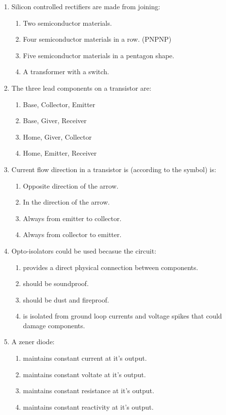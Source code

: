 \documentclass[10pt]{article}
\begin{document}
\begin{multicols}{2}
\begin{enumerate}
\begin{enumerate}
	\end{enumerate}
\item Silicon controlled rectifiers are made from joining:
	\begin{enumerate}
	\item Two semiconductor materials.
	\item Four semiconductor materials in a row. (PNPNP)
	\item Five semiconductor materials in a pentagon shape.
	\item A transformer with a switch.
	\end{enumerate}
\item The three lead components on a transistor are:
	\begin{enumerate}
	\item Base, Collector, Emitter
	\item Base, Giver, Receiver
	\item Home, Giver, Collector
	\item Home, Emitter, Receiver
	\end{enumerate}
\item Current flow direction in a transistor is (according to the symbol) is:
	\begin{enumerate}
	\item Opposite direction of the arrow.
	\item In the direction of the arrow.
	\item Always from emitter to collector.
	\item Always from collector to emitter.
	\end{enumerate}
\item Opto-isolators could be used becasue the circuit:
	\begin{enumerate}
	\item provides a direct physical connection between components.
	\item should be soundproof.
	\item should be dust and fireproof.
	\item is isolated from ground loop currents and voltage spikes that could damage components.
	\end{enumerate}
\item A zener diode:
	\begin{enumerate}
	\item maintains constant current at it's output.
	\item maintains constant voltate at it's output.
	\item maintains constant resistance at it's output.
	\item maintains constant reactivity at it's output.
	\end{enumerate}
\end{enumerate}
\end{multicols}
\end{document}
